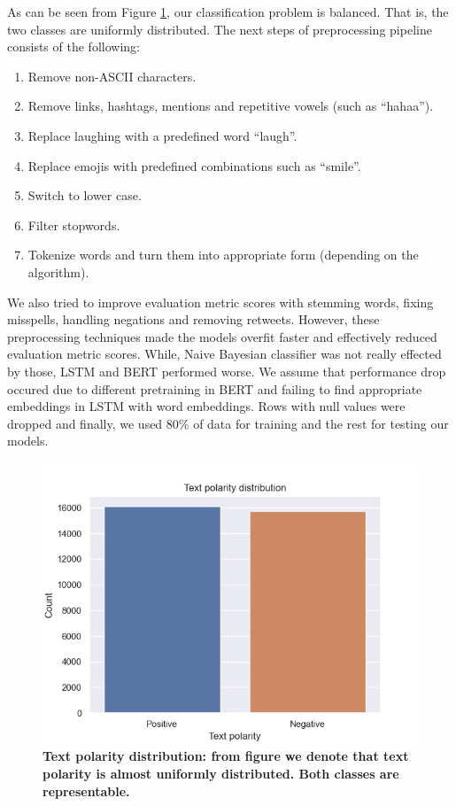 \documentclass[conference]{IEEEtran}
\begin{document}
As can be seen from Figure \ref{pic2}, our classification problem is balanced. That is, the two classes are uniformly distributed. The next steps of preprocessing pipeline consists of the following:
\begin{enumerate}
	\item Remove non-ASCII characters.
	\item Remove links, hashtags, mentions and repetitive vowels (such as ``hahaa'').
	\item Replace laughing with a predefined word ``laugh''.
	\item Replace emojis with predefined combinations such as ``smile''.
	\item Switch to lower case.
	\item Filter stopwords.
	\item Tokenize words and turn them into appropriate form (depending on the algorithm).
\end{enumerate}

We also tried to improve evaluation metric scores with stemming words, fixing misspells, handling negations and removing retweets. However, these preprocessing techniques made the models overfit faster and effectively reduced evaluation metric scores. While, Naive Bayesian classifier was not really effected by those, LSTM and BERT performed worse. We assume that performance drop occured due to different pretraining in BERT and failing to find appropriate embeddings in LSTM with word embeddings. Rows with null values were dropped and finally, we used 80\% of data for training and the rest for testing our models.

\begin{figure}[hbt!]\centering
\centering
\includegraphics[width=\linewidth]{text-polarity-distr}
\caption{\textbf{Text polarity distribution: from figure we denote that text polarity is almost uniformly distributed. Both classes are representable. }}
\label{pic2}
\end{figure}
\end{document}
